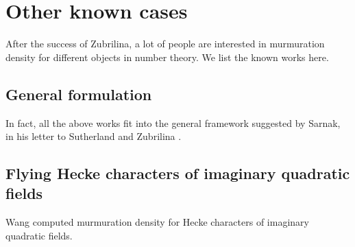 \section{Other known cases}

After the success of Zubrilina, a lot of people are interested in murmuration density for different objects in number theory.
We list the known works here.


\subsection{General formulation}

In fact, all the above works fit into the general framework suggested by Sarnak, in his letter to Sutherland and Zubrilina \cite{sarnak}.

\cite{lowry2025murmurations}


\subsection{Flying Hecke characters of imaginary quadratic fields}

Wang \cite{wang2025murmurations} computed murmuration density for Hecke characters of imaginary quadratic fields.

